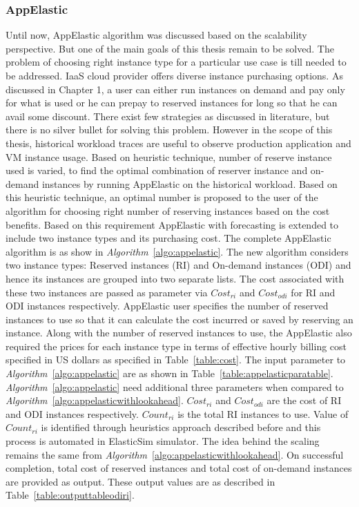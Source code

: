 \subsubsection{AppElastic}
\label{subs:AppElastic}
Until now, AppElastic algorithm was discussed based on the scalability perspective. But one of the main goals of this thesis remain to be solved. The problem of choosing right instance type for a particular use case is till needed to be addressed.  IaaS cloud provider offers diverse instance purchasing options. As discussed in Chapter 1, a user can either run instances on demand and pay only for what is used or he can prepay to reserved instances for long so that he can avail some discount. There  exist few strategies as discussed in literature\cite{wang2013reserve}, but there is no silver bullet for solving this problem. However in the scope of this thesis, historical workload traces are useful to observe production application and VM instance usage. Based on heuristic technique, number of reserve instance used is varied, to find the optimal combination of reserver instance and on-demand instances by running AppElastic on the historical workload. Based on this heuristic technique, an optimal number is proposed to the user of the algorithm for choosing right number of reserving instances based on the cost benefits. Based on this requirement AppElastic with forecasting is extended to include two instance types and its purchasing cost. The complete AppElastic algorithm is as show in \textit{Algorithm}~\ref{algo:appelastic}. The new algorithm considers two instance types: Reserved instances (RI) and On-demand instances (ODI) and hence its instances are grouped into two separate lists. The cost associated with these two instances are passed as parameter via $Cost_{ri}$ and $Cost_{odi}$ for RI and ODI instances respectively. AppElastic user specifies the number of reserved instances to use so that it can calculate the cost incurred or saved by reserving an instance. Along with the number of reserved instances to use, the AppElastic also required the prices for each instance type in terms of effective hourly billing cost specified in US dollars as specified in Table~\ref{table:cost}. The input parameter to \textit{Algorithm}~\ref{algo:appelastic} are as shown in Table~\ref{table:appelasticparatable}. \textit{Algorithm}~\ref{algo:appelastic} need additional three parameters when compared to \textit{Algorithm}~\ref{algo:appelasticwithlookahead}. $Cost_{ri}$ and $Cost_{odi}$ are the cost of RI and ODI instances respectively. $Count_{ri}$ is the total RI instances to use. Value of $Count_{ri}$ is identified through heuristics approach described before and this process is automated in ElasticSim simulator. The idea behind the scaling remains the same from \textit{Algorithm}~\ref{algo:appelasticwithlookahead}. On successful completion, total cost of reserved instances and total cost of on-demand instances are provided as output. These output values are as described in Table~\ref{table:outputtableodiri}.

